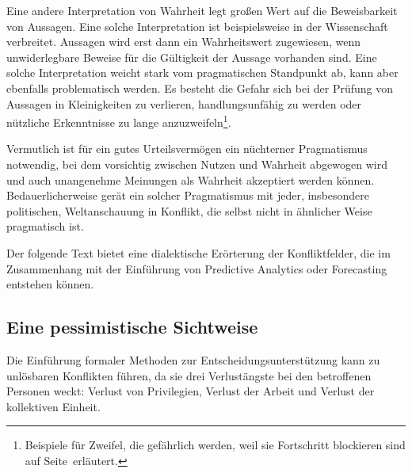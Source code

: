 Eine andere Interpretation von Wahrheit legt großen Wert auf die Beweisbarkeit
von Aussagen. Eine solche Interpretation ist beispielsweise in der Wissenschaft
verbreitet. Aussagen wird erst dann ein Wahrheitswert zugewiesen, wenn
unwiderlegbare Beweise für die Gültigkeit der Aussage vorhanden sind. Eine
solche Interpretation weicht stark vom pragmatischen Standpunkt ab, kann aber
ebenfalls problematisch werden. Es besteht die Gefahr sich bei der Prüfung von
Aussagen in Kleinigkeiten zu verlieren, handlungsunfähig zu werden oder
nützliche Erkenntnisse zu lange anzuzweifeln\footnote{
Beispiele für Zweifel, die gefährlich werden, weil sie Fortschritt blockieren
sind auf Seite~\xcom erläutert.
}.

Vermutlich ist für ein gutes Urteilsvermögen ein nüchterner Pragmatismus
notwendig, bei dem vorsichtig zwischen Nutzen und Wahrheit abgewogen wird und
auch unangenehme Meinungen als Wahrheit akzeptiert werden können.
Bedauerlicherweise gerät ein solcher Pragmatismus mit jeder, insbesondere
politischen, Weltanschauung in Konflikt, die selbst nicht in ähnlicher Weise
pragmatisch ist.

Der folgende Text bietet eine dialektische Erörterung der Konfliktfelder, die im
Zusammenhang mit der Einführung von Predictive Analytics oder Forecasting entstehen
können.


\subsection{Eine pessimistische Sichtweise}

Die Einführung formaler Methoden zur Entscheidungsunterstützung kann zu unlösbaren Konflikten führen,
da sie drei Verlustängste bei den betroffenen Personen weckt: Verlust von Privilegien,
Verlust der Arbeit und Verlust der kollektiven Einheit. 

